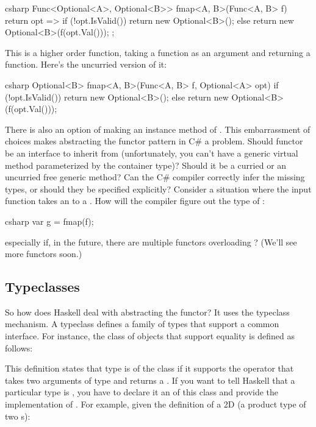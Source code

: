 \begin{snip}{csharp}
Func<Optional<A>, Optional<B>> fmap<A, B>(Func<A, B> f) {
    return opt => {
        if (!opt.IsValid())
            return new Optional<B>();
        else
            return new Optional<B>(f(opt.Val()));
    };
}
\end{snip}
This is a higher order function, taking a function as an argument and
returning a function. Here's the uncurried version of it:

\begin{snip}{csharp}
Optional<B> fmap<A, B>(Func<A, B> f, Optional<A> opt) {
    if (!opt.IsValid())
        return new Optional<B>();
    else
        return new Optional<B>(f(opt.Val()));
}
\end{snip}
There is also an option of making  an instance method of
. This embarrassment of choices makes abstracting the
functor pattern in C\# a problem. Should functor be an interface to
inherit from (unfortunately, you can't have a generic virtual method
parameterized by the container type)? Should it be a curried or an
uncurried free generic method? Can the
C\# compiler correctly infer the missing types, or should they be
specified explicitly? Consider a situation where the input function
 takes an  to a . How will the
compiler figure out the type of :

\begin{snip}{csharp}
var g = fmap(f);
\end{snip}
especially if, in the future, there are multiple functors overloading
? (We'll see more functors soon.)

\subsection{Typeclasses}

So how does Haskell deal with abstracting the functor? It uses the
typeclass mechanism. A typeclass defines a family of types that support
a common interface. For instance, the class of objects that support
equality is defined as follows:

This definition states that type  is of the class 
if it supports the operator \code{(==)} that takes two arguments of
type  and returns a . If you want to tell Haskell
that a particular type is , you have to declare it an
 of this class and provide the implementation of
\code{(==)}. For example, given the definition of a 2D 
(a product type of two s):

